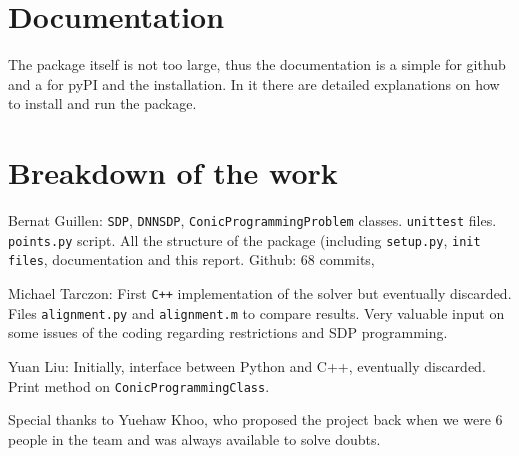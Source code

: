 \documentclass[paper=a4, fontsize=11pt]{scrartcl}
\numberwithin{equation}{section}		%
\numberwithin{figure}{section}			%
\numberwithin{table}{section}				%
\begin{document}
\section{Documentation}
The package itself is not too large, thus the documentation is a simple  for github and a  for pyPI and the installation. In it there are detailed explanations on how to install and run the package.

\section{Breakdown of the work}
Bernat Guillen: \texttt{SDP}, \texttt{DNNSDP}, \texttt{ConicProgrammingProblem} classes. \texttt{unittest} files. \texttt{points.py} script. All the structure of the package (including \texttt{setup.py}, \texttt{init files}, documentation and this report. Github: $68$ commits, 

Michael Tarczon: First \texttt{C++} implementation of the solver but eventually discarded. Files \texttt{alignment.py} and \texttt{alignment.m} to compare results. Very valuable input on some issues of the coding regarding restrictions and SDP programming.

Yuan Liu: Initially, interface between Python and C++, eventually discarded. Print method on \texttt{ConicProgrammingClass}.

Special thanks to Yuehaw Khoo, who proposed the project back when we were 6 people in the team and was always available to solve doubts.


\end{document}
